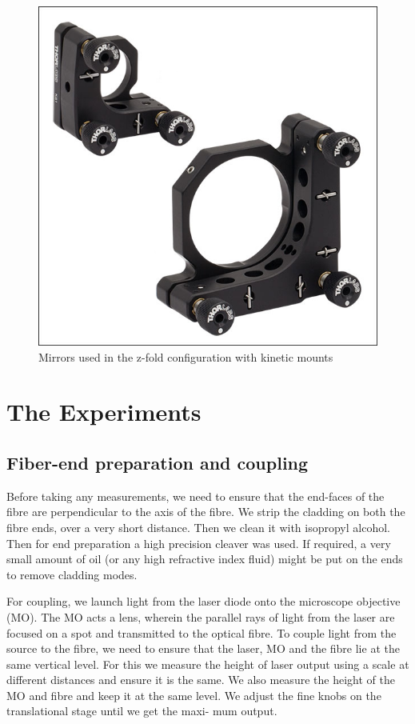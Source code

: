 \documentclass[%
 reprint,
nofootinbib,
 amsmath,amssymb,
 aps,
]{revtex4-2}
\begin{document}
\begin{figure}
	\centering
	\includegraphics[scale=0.3, trim=4 4 4 4,clip]{kineticMirror}
	\caption{Mirrors used in the z-fold configuration with kinetic mounts}
	\label{fig:kinetic}
\end{figure}

\section{The Experiments}
\subsection{Fiber-end preparation and coupling}
Before taking any measurements, we need to ensure that
the end-faces of the fibre are perpendicular to the axis of
the fibre. We strip the cladding on both the fibre ends, over a
very short distance. Then we clean it with isopropyl alcohol.
Then for end preparation a high precision cleaver was used.
If required, a very small amount of oil (or any high refractive
index fluid) might be put on the ends to remove cladding
modes.


For coupling, we launch light from the laser diode onto the
microscope objective (MO). The MO acts a lens, wherein the
parallel rays of light from the laser are focused on a spot and
transmitted to the optical fibre. To couple light from the
source to the fibre, we need to ensure that the laser, MO and
the fibre lie at the same vertical level. For this we measure
the height of laser output using a scale at different distances
and ensure it is the same. We also measure the height of the
MO and fibre and keep it at the same level. We adjust the
fine knobs on the translational stage until we get the maxi-
mum output.
\end{document}
